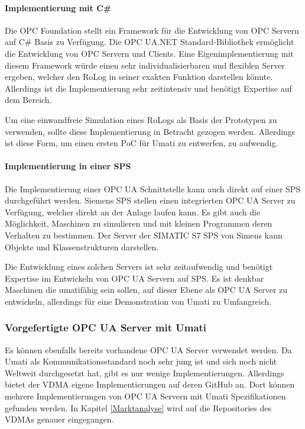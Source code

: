 \documentclass[a4paper, 12pt, oneside, toc=listofnumbered, bibliography=totoc]{scrbook}
\begin{document}
			\paragraph{Implementierung mit C\#}
			Die OPC Foundation stellt ein Framework für die Entwicklung von OPC Servern auf C\# Basis zu Verfügung. Die OPC UA.NET Standard-Bibliothek ermöglicht die Entwicklung von OPC Servern und Clients. Eine Eigenimplementierung mit diesem Framework würde einen sehr individualisierbaren und flexiblen Server ergeben, welcher den RoLog in seiner exakten Funktion darstellen könnte. Allerdings ist die Implementierung sehr zeitintensiv und benötigt Expertise auf dem Bereich. \cite{noauthor_opc_nodate-1}
			
			Um eine einwandfreie Simulation eines RoLogs als Basis der Prototypen zu verwenden, sollte diese Implementierung in Betracht gezogen werden. Allerdings ist diese Form, um einen ersten \ac{PoC} für Umati zu entwerfen, zu aufwendig.
			
			\paragraph{Implementierung in einer SPS}
			Die Implementierung einer OPC UA Schnittstelle kann auch direkt auf einer SPS durchgeführt werden. Siemens SPS stellen einen integrierten OPC UA Server zu Verfügung, welcher direkt an der Anlage laufen kann. Es gibt auch die Möglichkeit, Maschinen zu simulieren und mit kleinen Programmen deren Verhalten zu bestimmen. Der Server der SIMATIC S7 SPS von Simens kann Objekte und Klassenstrukturen darstellen. \cite{noauthor_tia_2019}
			
			Die Entwicklung eines solchen Servers ist sehr zeitaufwendig und benötigt Expertise im Entwickeln von OPC UA Servern auf SPS. Es ist denkbar Maschinen die umatifähig sein sollen, auf dieser Ebene als OPC UA Server zu entwickeln, allerdings für eine Demonstration von Umati zu Umfangreich.
			
			\subsubsection{Vorgefertigte OPC UA Server mit Umati}
			
			Es können ebenfalls bereits vorhandene OPC UA Server verwendet werden. Da Umati als Kommunikationsstandard noch sehr jung ist und sich noch nicht Weltweit durchgesetzt hat, gibt es nur wenige Implementierungen. Allerdings bietet der VDMA eigene Implementierungen auf deren GitHub an. Dort können mehrere Implementierungen von OPC UA Servern mit Umati Spezifikationen gefunden werden. In Kapitel \ref{Marktanalyse} wird auf die Repositories des VDMAs genauer eingegangen.
	
\end{document}
